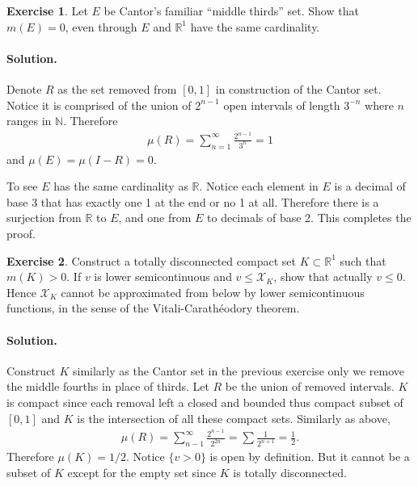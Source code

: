 \documentclass[10pt,a4paper]{book}
\theoremstyle{definition}
\newtheorem{exercise}{Exercise}[chapter]
\newcommand{\R}{\mathbb R}
\begin{document}
	\begin{exercise}
		Let $ E $ be Cantor's familiar ``middle thirds'' set. Show that $ m(E) = 0 $, even through $ E $ and $ \R ^{1}  $ have the same cardinality.
		\paragraph{Solution. }
		Denote $ R $ as the set removed from $ [0, 1] $ in construction of the Cantor set. Notice it is comprised of the union of $ 2 ^{n-1} $ open intervals of length $ 3 ^{-n} $ where $ n $ ranges in $ \mathbb{N} $. Therefore
		\begin{align*}
			\mu(R) = \sum_{n=1}^{\infty} \frac {2 ^{n-1}}{3^n} = 1
		\end{align*}
		and $ \mu(E) = \mu(I - R) = 0 $.

		To see $ E $ has the same cardinality as $ \R $. Notice each element in $ E $ is a decimal of base 3 that has exactly one 1 at the end or no 1 at all. Therefore there is a surjection from $ \R $ to $ E $, and one from $ E $ to decimals of base 2. This completes the proof.

	\end{exercise}

	\begin{exercise}
		Construct a totally disconnected compact set $ K \subset \R^1 $ such that $ m(K) > 0 $. If $ v $ is lower semicontinuous and $ v \le \mathcal{X}_K $, show that actually $ v \le 0 $. Hence $ \mathcal{X}_K $ cannot be approximated from below by lower semicontinuous functions, in the sense of the Vitali-Carath\'eodory theorem.
		\paragraph{Solution. }
		Construct $ K $ similarly as the Cantor set in the previous exercise only we remove the middle fourths in place of thirds. Let $ R $ be the union of removed intervals. $ K $ is compact since each removal left a closed and bounded thus compact subset of $ [0, 1] $ and $ K $ is the intersection of all these compact sets. Similarly as above,
		\begin{align*}
			\mu(R) = \sum_{n-1}^{\infty} \frac {2 ^{n-1} }{2 ^{2n} } = \sum \frac {1}{2 ^{n+1} } = \frac {1}{2} .
		\end{align*}
		Therefore $ \mu(K) = 1/2 $. Notice $ \{v > 0\} $ is open by definition. But it cannot be a subset of $ K $ except for the empty set since $ K $ is totally disconnected.

	\end{exercise}
\end{document}

